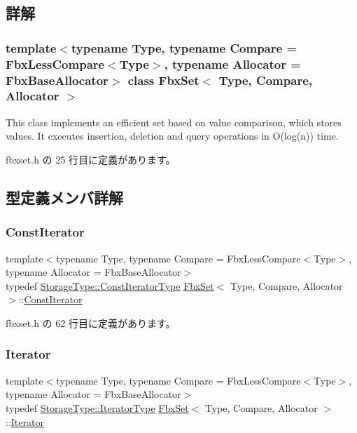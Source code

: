 \subsection{詳解}
\subsubsection*{template$<$typename Type, typename Compare = Fbx\+Less\+Compare$<$\+Type$>$, typename Allocator = Fbx\+Base\+Allocator$>$\newline
class Fbx\+Set$<$ Type, Compare, Allocator $>$}

This class implements an efficient set based on value comparison, which stores values. It executes insertion, deletion and query operations in O(log(n)) time. 

 fbxset.\+h の 25 行目に定義があります。



\subsection{型定義メンバ詳解}
\mbox{\label{class_fbx_set_af9aee2f7b6a6638b816ea95bd510928c}} 
\subsubsection{\texorpdfstring{Const\+Iterator}{ConstIterator}}
{\footnotesize\ttfamily template$<$typename Type, typename Compare = Fbx\+Less\+Compare$<$\+Type$>$, typename Allocator = Fbx\+Base\+Allocator$>$ \\
typedef \hyperlink{class_fbx_red_black_tree_a7309ae5e1bb24e7e3da94fef975d10c4}{Storage\+Type\+::\+Const\+Iterator\+Type} \hyperlink{class_fbx_set}{Fbx\+Set}$<$ Type, Compare, Allocator $>$\+::\hyperlink{class_fbx_set_af9aee2f7b6a6638b816ea95bd510928c}{Const\+Iterator}}



 fbxset.\+h の 62 行目に定義があります。

\mbox{\label{class_fbx_set_ad1b543e0f63f04f4d2dc8e9e3da9bcaa}} 
\subsubsection{\texorpdfstring{Iterator}{Iterator}}
{\footnotesize\ttfamily template$<$typename Type, typename Compare = Fbx\+Less\+Compare$<$\+Type$>$, typename Allocator = Fbx\+Base\+Allocator$>$ \\
typedef \hyperlink{class_fbx_red_black_tree_af7b6209131012ec5aa33e0286c956cd6}{Storage\+Type\+::\+Iterator\+Type} \hyperlink{class_fbx_set}{Fbx\+Set}$<$ Type, Compare, Allocator $>$\+::\hyperlink{class_fbx_set_ad1b543e0f63f04f4d2dc8e9e3da9bcaa}{Iterator}}



